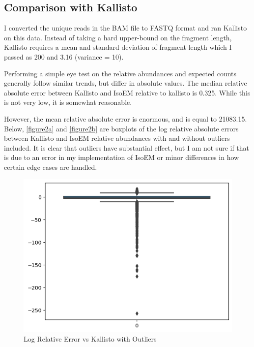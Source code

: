 \documentclass{article}
\begin{document}
\subsection*{Comparison with Kallisto}

I converted the unique reads in the BAM file to FASTQ format and ran Kallisto \cite{kallisto} on this data. Instead of taking a hard upper-bound on the fragment length, Kallisto requires a mean and standard deviation of fragment length which I passed as 200 and 3.16 (variance = 10).

Performing a simple eye test on the relative abundances and expected counts generally follow similar trends, but differ in absolute values. The median relative absolute error between Kallisto and IsoEM relative to kallisto is 0.325. While this is not very low, it is somewhat reasonable.

However, the mean relative absolute error is enormous, and is equal to 21083.15. Below, \autoref{figure2a} and \autoref{figure2b} are boxplots of the log relative absolute errors between Kallisto and IsoEM relative abundances with and without outliers included. It is clear that outliers have substantial effect, but I am not sure if that is due to an error in my implementation of IsoEM or minor differences in how certain edge cases are handled.

\begin{figure}[H]
    \centering
      \includegraphics[width=0.8\linewidth]{./images/outliers.png}
  \caption{Log Relative Error vs Kallisto with Outliers}\label{figure2a}%
\end{figure}
\end{document}
